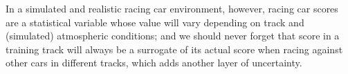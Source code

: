 \documentclass[10pt,journal,compsoc]{IEEEtran}
\begin{document}
\IEEEdisplaynontitleabstractindextext



%
\IEEEpeerreviewmaketitle





In a simulated and
    realistic racing car environment, however, racing car scores are a
    statistical variable whose value will vary depending on track and
    (simulated) atmospheric conditions; and we should never forget
    that score in a training track will always be a surrogate of its
    actual score when racing against other cars in different tracks,
    which adds another layer of uncertainty.


\end{document}
